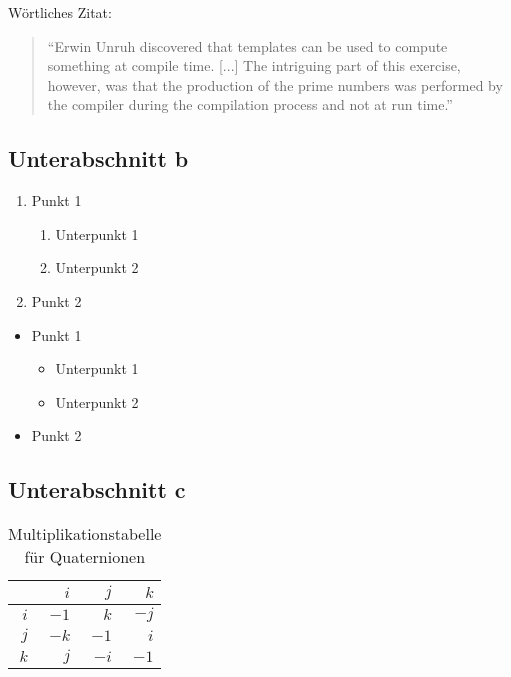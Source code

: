 Wörtliches Zitat:
\begin{quote}
``Erwin Unruh discovered that templates can be used to compute
something at compile time. [...] The intriguing part of this exercise, however, was that the production of the prime numbers was performed by the compiler during the compilation process and not at run time.''

\autocite[305]{Bosch2014}
\end{quote}
\selectthesislanguage


\subsection{Unterabschnitt b}

\begin{enumerate}
	\item Punkt 1
	\begin{enumerate}
		\item Unterpunkt 1
		\item Unterpunkt 2
	\end{enumerate}
	\item Punkt 2
\end{enumerate}

\begin{itemize}
	\item Punkt 1
	\begin{itemize}
		\item Unterpunkt 1
		\item Unterpunkt 2
	\end{itemize}
	\item Punkt 2
\end{itemize}


\subsection{Unterabschnitt c}

\begin{table}[ht]
	\centering
	\begin{tabular}{r|rrr}
		    & $i$ & $j$ & $k$ \\ \hline
		$i$ &$-1$ & $k$ &$-j$ \\
		$j$ &$-k$ &$-1$ & $i$ \\
		$k$ & $j$ &$-i$ &$-1$
	\end{tabular}
	\caption{
		Multiplikationstabelle für Quaternionen
	}
	\label{table:Quaternions}
\end{table}

